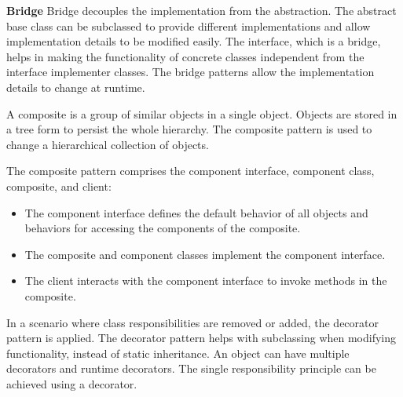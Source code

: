 

\textbf{Bridge}
Bridge decouples the implementation from the abstraction. The
abstract base class can be subclassed to provide different
implementations and allow implementation details to be
modified easily. The interface, which is a bridge, helps in making
the functionality of concrete classes independent from the
interface implementer classes. The bridge patterns allow the
implementation details to change at runtime.




\begin{mdframed}[style=important, frametitle={Composite}]
A composite is a group of similar objects in a single object.
Objects are stored in a tree form to persist the whole hierarchy.
The composite pattern is used to change a hierarchical collection
of objects. 
\end{mdframed}

The composite pattern comprises the component interface, component
class, composite, and client:
\begin{itemize}
	\item The component interface defines the default behavior of all
	objects and behaviors for accessing the components of
	the composite.
	\item  The composite and component classes implement the component
	interface.
	\item The client interacts with the component interface to
	invoke methods in the composite.
\end{itemize}

\begin{mdframed}[style=important, frametitle={Decorator}]
In a scenario where class responsibilities are removed or added,
the decorator pattern is applied. The decorator pattern helps
with subclassing when modifying functionality, instead of static
inheritance. An object can have multiple decorators and runtime decorators. The single responsibility principle can be
achieved using a decorator.
\end{mdframed}
